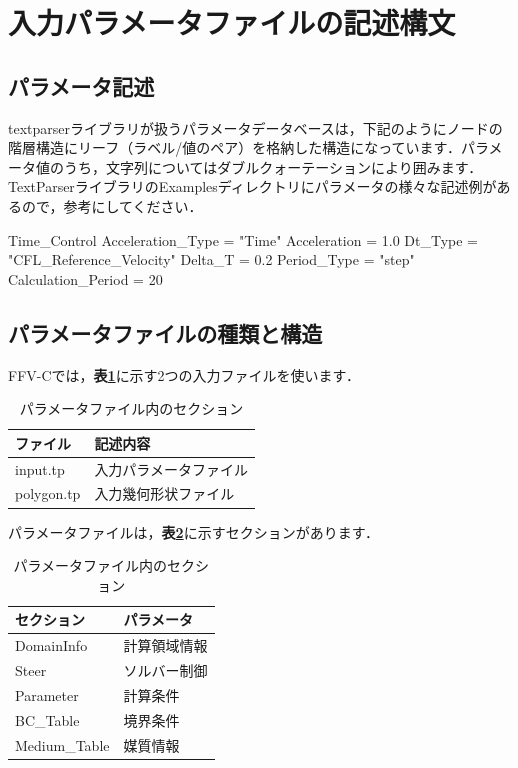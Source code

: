 \graphicspath{{./fig_Param/}}

%
\section{入力パラメータファイルの記述構文}
%
\subsection{パラメータ記述}
textparserライブラリが扱うパラメータデータベースは，下記のようにノードの階層構造にリーフ（ラベル/値のペア）を格納した構造になっています．パラメータ値のうち，文字列についてはダブルクォーテーションにより囲みます．
TextParserライブラリのExamplesディレクトリにパラメータの様々な記述例があるので，参考にしてください．

{
\small 
\begin{program}
  Time_Control {
    Acceleration_Type  = "Time"
    Acceleration       = 1.0
    Dt_Type            = "CFL_Reference_Velocity"
    Delta_T            = 0.2
    Period_Type        = "step"
    Calculation_Period = 20
  }
\end{program}
}


%
\subsection{パラメータファイルの種類と構造}
FFV-Cでは，\textbf{表\ref{tbl:input_files}}に示す2つの入力ファイルを使います．

\begin{table}[htdp]
\caption{パラメータファイル内のセクション}
\begin{center}
\small
\begin{tabular}{ll} \toprule
ファイル & 記述内容\\ \midrule
input.tp & 入力パラメータファイル\\
polygon.tp & 入力幾何形状ファイル\\ \bottomrule
\end{tabular}
\end{center}
\label{tbl:input_files}
\end{table}


パラメータファイルは，\textbf{表\ref{tbl:param_tag}}に示すセクションがあります．


\begin{table}[htdp]
\caption{パラメータファイル内のセクション}
\begin{center}
\small
\begin{tabular}{ll} \toprule
セクション & パラメータ\\ \midrule
DomainInfo & 計算領域情報\\
Steer & ソルバー制御\\
Parameter & 計算条件\\
BC\_Table & 境界条件\\
Medium\_Table & 媒質情報\\ \bottomrule
\end{tabular}
\end{center}
\label{tbl:param_tag}
\end{table}


